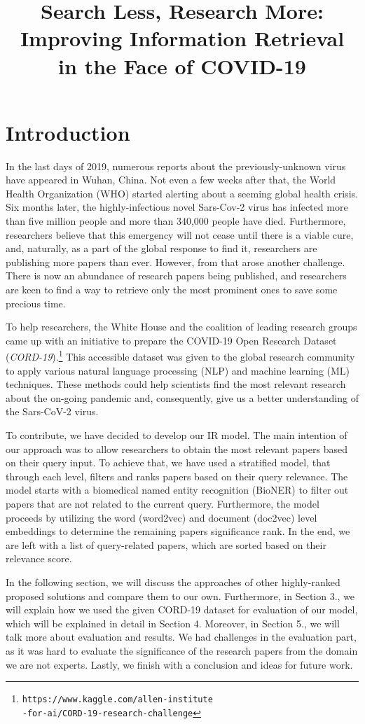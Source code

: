 \documentclass[10pt, a4paper]{article}
\title{
	Search Less, Research More: Improving Information Retrieval\\
	in the Face of COVID-19\\
}
\begin{document}
	
	\maketitleabstract
	
	\section{Introduction}
	
	In the last days of 2019, numerous reports about the previously-unknown virus have appeared in Wuhan, China. Not even a few weeks after that, the World Health Organization (WHO) started alerting about a seeming global health crisis. Six months later, the highly-infectious novel Sars-Cov-2 virus has infected more than five million people and more than 340,000 people have died. Furthermore, researchers believe that this emergency will not cease until there is a viable cure, and, naturally, as a part of the global response to find it, researchers are publishing more papers than ever. However, from that arose another challenge. There is now an abundance of research papers being published, and researchers are keen to find a way to retrieve only the most prominent ones to save some precious time.

	To help researchers, the White House and the coalition of leading research groups came up with an initiative to prepare the COVID-19 Open Research Dataset (\emph{CORD-19}).\footnote{\texttt{https://www.kaggle.com/allen-institute\\-for-ai/CORD-19-research-challenge}} This accessible dataset was given to the global research community to apply various natural language processing (NLP) and machine learning (ML) techniques. These methods could help scientists ﬁnd the most relevant research about the on-going pandemic and, consequently, give us a better understanding of the Sars-CoV-2 virus.

	To contribute, we have decided to develop our IR model. The main intention of our approach was to allow researchers to obtain the most relevant papers based on their query input. To achieve that, we have used a stratified model, that through each level, filters and ranks papers based on their query relevance.  The model starts with a biomedical named entity recognition (BioNER) to filter out papers that are not related to the current query. Furthermore, the model proceeds by utilizing the word (word2vec) and document (doc2vec) level embeddings to determine the remaining papers significance rank. In the end, we are left with a list of query-related papers, which are sorted based on their relevance score.

	In the following section, we will discuss the approaches of other highly-ranked proposed solutions and compare them to our own. Furthermore, in Section 3., we will explain how we used the given CORD-19 dataset for evaluation of our model, which will be explained in detail in Section 4. Moreover, in Section 5., we will talk more about evaluation and results.  We had challenges in the evaluation part, as it was hard to evaluate the significance of the research papers from the domain we are not experts. Lastly, we finish with a conclusion and ideas for future work.
\end{document}
